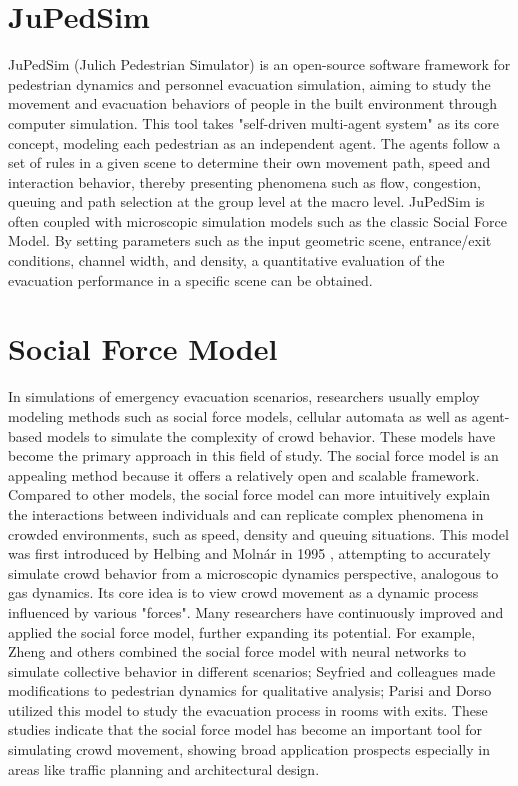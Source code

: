 \section{JuPedSim}
JuPedSim (Julich Pedestrian Simulator) is an open-source software framework for pedestrian dynamics and personnel evacuation simulation, aiming to study the movement and evacuation behaviors of people in the built environment through computer simulation. This tool takes "self-driven multi-agent system" as its core concept, modeling each pedestrian as an independent agent. The agents follow a set of rules in a given scene to determine their own movement path, speed and interaction behavior, thereby presenting phenomena such as flow, congestion, queuing and path selection at the group level at the macro level. JuPedSim is often coupled with microscopic simulation models such as the classic Social Force Model. By setting parameters such as the input geometric scene, entrance/exit conditions, channel width, and density, a quantitative evaluation of the evacuation performance in a specific scene can be obtained.

\section{Social Force Model}
In simulations of emergency evacuation scenarios, researchers usually employ modeling methods such as social force models, cellular automata as well as agent-based models to simulate the complexity of crowd behavior. These models have become the primary approach in this field of study.
The social force model is an appealing method because it offers a relatively open and scalable framework. Compared to other models, the social force model can more intuitively explain the interactions between individuals and can replicate complex phenomena in crowded environments, such as speed, density and queuing situations. This model was first introduced by Helbing and Molnár in 1995 \cite{helbingSocialForceModel1995}, attempting to accurately simulate crowd behavior from a microscopic dynamics perspective, analogous to gas dynamics. Its core idea is to view crowd movement as a dynamic process influenced by various "forces".
Many researchers have continuously improved and applied the social force model, further expanding its potential. For example, Zheng and others combined the social force model with neural networks to simulate collective behavior in different scenarios; Seyfried and colleagues made modifications to pedestrian dynamics for qualitative analysis; Parisi and Dorso utilized this model to study the evacuation process in rooms with exits. These studies indicate that the social force model has become an important tool for simulating crowd movement, showing broad application prospects especially in areas like traffic planning and architectural design.

